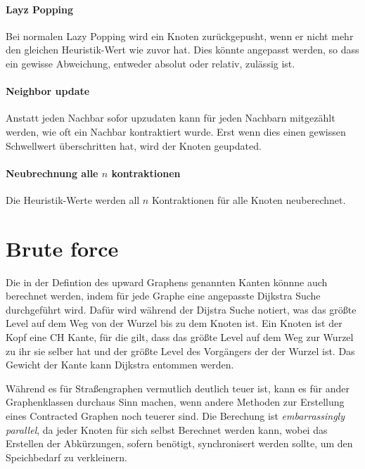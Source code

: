 \paragraph{Layz Popping}
Bei normalen Lazy Popping wird ein Knoten zurückgepusht, wenn er nicht mehr den gleichen Heuristik-Wert wie zuvor hat.
Dies könnte angepasst werden, so dass ein gewisse Abweichung, entweder absolut oder relativ, zulässig ist.

\paragraph{Neighbor update}
Anstatt jeden Nachbar sofor upzudaten kann für jeden Nachbarn mitgezählt werden, wie oft ein Nachbar kontraktiert wurde.
Erst wenn dies einen gewissen Schwellwert überschritten hat, wird der Knoten geupdated.

\paragraph{Neubrechnung alle $n$ kontraktionen}
Die Heuristik-Werte werden all $n$ Kontraktionen für alle Knoten neuberechnet.

\section{Brute force}

Die in der Defintion des upward Graphens genannten Kanten könnne auch berechnet werden, indem für jede Graphe eine angepasste Dijkstra Suche durchgeführt wird.
Dafür wird während der Dijstra Suche notiert, was das größte Level auf dem Weg von der Wurzel bis zu dem Knoten ist.
Ein Knoten ist der Kopf eine CH Kante, für die gilt, dass das größte Level auf dem Weg zur Wurzel zu ihr sie selber hat und der größte Level des Vorgängers der der Wurzel ist.
Das Gewicht der Kante kann Dijkstra entommen werden.

Während es für Straßengraphen vermutlich deutlich teuer ist, kann es für ander Graphenklassen durchaus Sinn machen, wenn andere Methoden zur Erstellung eines Contracted Graphen noch teuerer sind.
Die Berechung ist \emph{embarrassingly parallel}, da jeder Knoten für sich selbst Berechnet werden kann, wobei das Erstellen der Abkürzungen, sofern benötigt, synchronisert werden sollte, um den Speichbedarf zu verkleinern.


